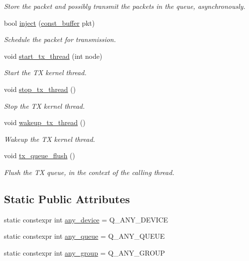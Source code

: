 \begin{DoxyCompactItemize}
\begin{DoxyCompactList}\small\item\em Store the packet and possibly transmit the packets in the queue, asynchronously. \end{DoxyCompactList}\item 
bool \hyperlink{classnet_1_1pfq_ac3ff560f61fb181bbc94f305c8f98569}{inject} (\hyperlink{namespacenet_a05639001760fe5164b163078b5ccc2c0}{const\+\_\+buffer} pkt)
\begin{DoxyCompactList}\small\item\em Schedule the packet for transmission. \end{DoxyCompactList}\item 
void \hyperlink{classnet_1_1pfq_a90c4ea400b987ae1f75fb1c1574fefa5}{start\+\_\+tx\+\_\+thread} (int node)
\begin{DoxyCompactList}\small\item\em Start the T\+X kernel thread. \end{DoxyCompactList}\item 
void \hyperlink{classnet_1_1pfq_ab45272fa6c3b0ccaaf9b7c6049493e7f}{stop\+\_\+tx\+\_\+thread} ()
\begin{DoxyCompactList}\small\item\em Stop the T\+X kernel thread. \end{DoxyCompactList}\item 
void \hyperlink{classnet_1_1pfq_a0f7e48a2b3a175351bc648704de4574c}{wakeup\+\_\+tx\+\_\+thread} ()
\begin{DoxyCompactList}\small\item\em Wakeup the T\+X kernel thread. \end{DoxyCompactList}\item 
void \hyperlink{classnet_1_1pfq_ac62937a932e1af8669f72ee165366397}{tx\+\_\+queue\+\_\+flush} ()
\begin{DoxyCompactList}\small\item\em Flush the T\+X queue, in the context of the calling thread. \end{DoxyCompactList}\end{DoxyCompactItemize}
\subsection*{Static Public Attributes}
\begin{DoxyCompactItemize}
\item 
static constexpr int \hyperlink{classnet_1_1pfq_a8ecbb4cb4e632b85865a6c77fd4a6a45}{any\+\_\+device} = Q\+\_\+\+A\+N\+Y\+\_\+\+D\+E\+V\+I\+C\+E
\item 
static constexpr int \hyperlink{classnet_1_1pfq_a0d4eca6d0925b7c49365675c9cf9385c}{any\+\_\+queue} = Q\+\_\+\+A\+N\+Y\+\_\+\+Q\+U\+E\+U\+E
\item 
static constexpr int \hyperlink{classnet_1_1pfq_a3aa94e5b77640a4db592893fa9220e81}{any\+\_\+group} = Q\+\_\+\+A\+N\+Y\+\_\+\+G\+R\+O\+U\+P
\end{DoxyCompactItemize}


